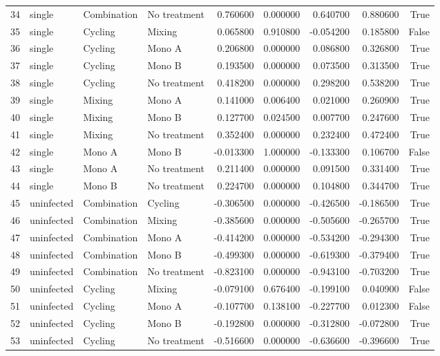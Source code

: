 \begin{tabular}{llllrrrrr}
34 & single & Combination & No treatment & 0.760600 & 0.000000 & 0.640700 & 0.880600 & True \\
35 & single & Cycling & Mixing & 0.065800 & 0.910800 & -0.054200 & 0.185800 & False \\
36 & single & Cycling & Mono A & 0.206800 & 0.000000 & 0.086800 & 0.326800 & True \\
37 & single & Cycling & Mono B & 0.193500 & 0.000000 & 0.073500 & 0.313500 & True \\
38 & single & Cycling & No treatment & 0.418200 & 0.000000 & 0.298200 & 0.538200 & True \\
39 & single & Mixing & Mono A & 0.141000 & 0.006400 & 0.021000 & 0.260900 & True \\
40 & single & Mixing & Mono B & 0.127700 & 0.024500 & 0.007700 & 0.247600 & True \\
41 & single & Mixing & No treatment & 0.352400 & 0.000000 & 0.232400 & 0.472400 & True \\
42 & single & Mono A & Mono B & -0.013300 & 1.000000 & -0.133300 & 0.106700 & False \\
43 & single & Mono A & No treatment & 0.211400 & 0.000000 & 0.091500 & 0.331400 & True \\
44 & single & Mono B & No treatment & 0.224700 & 0.000000 & 0.104800 & 0.344700 & True \\
45 & uninfected & Combination & Cycling & -0.306500 & 0.000000 & -0.426500 & -0.186500 & True \\
46 & uninfected & Combination & Mixing & -0.385600 & 0.000000 & -0.505600 & -0.265700 & True \\
47 & uninfected & Combination & Mono A & -0.414200 & 0.000000 & -0.534200 & -0.294300 & True \\
48 & uninfected & Combination & Mono B & -0.499300 & 0.000000 & -0.619300 & -0.379400 & True \\
49 & uninfected & Combination & No treatment & -0.823100 & 0.000000 & -0.943100 & -0.703200 & True \\
50 & uninfected & Cycling & Mixing & -0.079100 & 0.676400 & -0.199100 & 0.040900 & False \\
51 & uninfected & Cycling & Mono A & -0.107700 & 0.138100 & -0.227700 & 0.012300 & False \\
52 & uninfected & Cycling & Mono B & -0.192800 & 0.000000 & -0.312800 & -0.072800 & True \\
53 & uninfected & Cycling & No treatment & -0.516600 & 0.000000 & -0.636600 & -0.396600 & True \\

\end{tabular}

